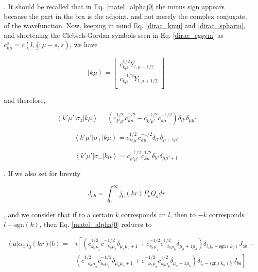 \documentclass[]{report}
\newcommand{\bra}[1]{\left<#1\right|}
\newcommand{\ket}[1]{\left|#1\right>}
\newcommand{\braket}[3]{\bra{#1}#2\ket{#3}}
\begin{document}
. It should be recalled that in Eq. \ref{matel_alphaj0} the minus sign appears because the part in the bra is the adjoint, and not merely the complex conjugate, of the wavefunction. Now, keeping in mind Eq. \ref{dirac_kmu} and \ref{dirac_spharm}, and shortening the Clebsch-Gordan symbols seen in Eq. \ref{dirac_cgsym} as $c_{k\mu}^s = c(l,\frac{1}{2};\mu-s, s)$, we have

\begin{equation}
\ket{k\mu} = \begin{bmatrix}
c_{k\mu}^{1/2} Y_{l,\mu-1/2} \\
c_{k\mu}^{-1/2} Y_{l,\mu+1/2} \\
\end{bmatrix}
\end{equation}

and therefore,

\begin{equation}\label{matel_sz}
\braket{k'\mu'}{\sigma_z}{k\mu} = \left(c_{k'\mu'}^{1/2}c_{k\mu}^{1/2}-c_{k'\mu'}^{-1/2}c_{k\mu}^{-1/2}\right)\delta_{ll'}\delta_{\mu\mu'}
\end{equation}

\begin{equation}\label{matel_sp}
\braket{k'\mu'}{\sigma_+}{k\mu} = c_{k'\mu'}^{1/2} c_{k\mu}^{-1/2}\delta_{ll'}\delta_{\mu+1\mu'}
\end{equation}

\begin{equation}\label{matel_sm}
\braket{k'\mu'}{\sigma_-}{k\mu} = c_{k'\mu'}^{-1/2} c_{k\mu}^{1/2}\delta_{ll'}\delta_{\mu\mu'+1}
\end{equation}

. If we also set for brevity

\begin{equation}\label{pq_ints}
J_{ab} = \int_{0}^{\infty}j_0(kr)P_aQ_b dr
\end{equation}

, and we consider that if to a certain $k$ corresponds an $l$, then to $-k$ corresponds $l-\mathrm{sgn}(k)$, then Eq. \ref{matel_alphaj0} reduces to

\begin{align}\label{matel_alphaxj0}
\braket{a}{\alpha_xj_0(kr)}{b} = & i\left[\left(c_{k_a\mu_a}^{1/2} c_{-k_b\mu_b}^{-1/2}\delta_{\mu_a\mu_b+1}
+ c_{k_a\mu_a}^{-1/2} c_{-k_b\mu_b}^{1/2}\delta_{\mu_a+1\mu_b}\right)
\delta_{l_al_b-\mathrm{sgn}(k_b)} J_{ab}  - \right. \\
&\left. 
\left(c_{-k_a\mu_a}^{1/2} c_{k_b\mu_b}^{-1/2}\delta_{\mu_a\mu_b+1}
+ c_{-k_a\mu_a}^{-1/2} c_{k_b\mu_b}^{1/2}\delta_{\mu_a+1\mu_b}\right)
\delta_{l_a-\mathrm{sgn}(k_a)l_b} J_{ba} 
\right] \nonumber
\end{align}
\end{document}
